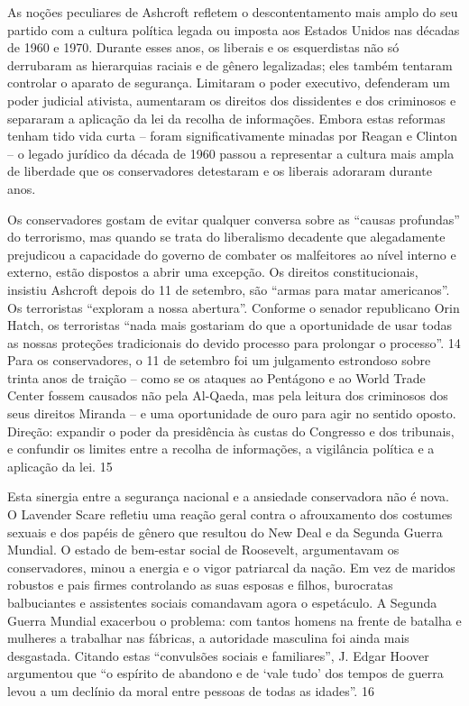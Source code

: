 As noções peculiares de Ashcroft refletem o descontentamento mais amplo do seu partido com a cultura política legada ou imposta aos Estados Unidos nas décadas de 1960 e 1970. Durante esses anos, os liberais e os esquerdistas não só derrubaram as hierarquias raciais e de gênero legalizadas; eles também tentaram controlar o aparato de segurança. Limitaram o poder executivo, defenderam um poder judicial ativista, aumentaram os direitos dos dissidentes e dos criminosos e separaram a aplicação da lei da recolha de informações. Embora estas reformas tenham tido vida curta – foram significativamente minadas por Reagan e Clinton – o legado jurídico da década de 1960 passou a representar a cultura mais ampla de liberdade que os conservadores detestaram e os liberais adoraram durante anos.
 
\par
 
Os conservadores gostam de evitar qualquer conversa sobre as “causas profundas” do terrorismo, mas quando se trata do liberalismo decadente que alegadamente prejudicou a capacidade do governo de combater os malfeitores ao nível interno e externo, estão dispostos a abrir uma excepção. Os direitos constitucionais, insistiu Ashcroft depois do 11 de setembro, são “armas para matar americanos”. Os terroristas “exploram a nossa abertura”. Conforme o senador republicano Orin Hatch, os terroristas “nada mais gostariam do que a oportunidade de usar todas as nossas proteções tradicionais do devido processo para prolongar o processo”.
 {\color{blue} 14}  
Para os conservadores, o 11 de setembro foi um julgamento estrondoso sobre trinta anos de traição – como se os ataques ao Pentágono e ao World Trade Center fossem causados ​​não pela Al-Qaeda, mas pela leitura dos criminosos dos seus direitos Miranda – e uma oportunidade de ouro para agir no sentido oposto. Direção: expandir o poder da presidência às custas do Congresso e dos tribunais, e confundir os limites entre a recolha de informações, a vigilância política e a aplicação da lei.
 {\color{blue} 15}  

 
\par
 
Esta sinergia entre a segurança nacional e a ansiedade conservadora não é nova. O Lavender Scare refletiu uma reação geral contra o afrouxamento dos costumes sexuais e dos papéis de gênero que resultou do New Deal e da Segunda Guerra Mundial. O estado de bem-estar social de Roosevelt, argumentavam os conservadores, minou a energia e o vigor patriarcal da nação. Em vez de maridos robustos e pais firmes controlando as suas esposas e filhos, burocratas balbuciantes e assistentes sociais comandavam agora o espetáculo. A Segunda Guerra Mundial exacerbou o problema: com tantos homens na frente de batalha e mulheres a trabalhar nas fábricas, a autoridade masculina foi ainda mais desgastada. Citando estas “convulsões sociais e familiares”, J. Edgar Hoover argumentou que “o espírito de abandono e de ‘vale tudo’ dos tempos de guerra levou a um declínio da moral entre pessoas de todas as idades”.
 {\color{blue} 16}  

